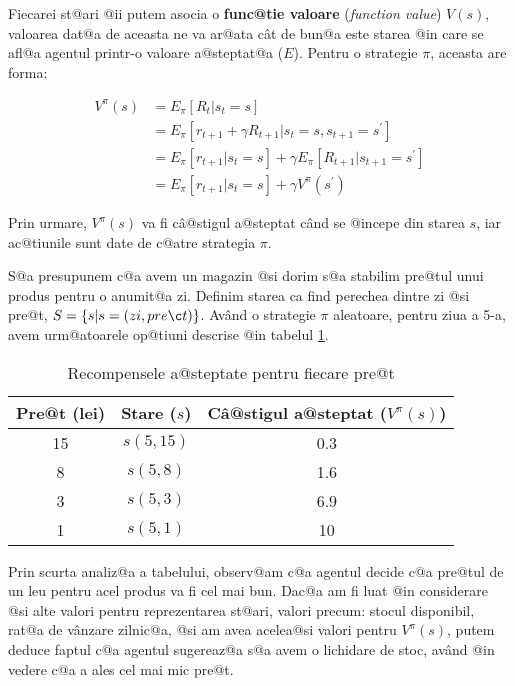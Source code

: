 Fiecarei st@ari @ii putem asocia o \textbf{func@tie valoare} (\textsl{function value}) $V(s)$, valoarea dat@a de aceasta ne va ar@ata c\^ at de bun@a este starea @in care se afl@a agentul printr-o valoare a@steptat@a ($E$). Pentru o strategie $\pi$, aceasta are forma:


\begin{align}
	V^{\pi}(s) & =   E_{\pi} \left[ R_t | s_t = s \right] \nonumber \\
	& =  E_{\pi} \left[ r_{t+1} + \gamma R_{t+1} | s_t = s, s_{t+1} = s^{\prime} \right] \nonumber \\
	& =   E_{\pi} \left[ r_{t+1}| s_t = s \right] + \gamma E_{\pi} \left[  R_{t+1} | s_{t+1} = s^{\prime} \right] \nonumber \\
	& =  E_{\pi} \left[ r_{t+1}| s_t = s \right] + \gamma V^{\pi}(s^{\prime})
\end{align}

\noindent Prin urmare, $V^{\pi}(s)$ va fi c\^ a@stigul a@steptat c\^ and se @incepe din starea $s$, iar ac@tiunile sunt date de c@atre strategia $\pi$.

S@a presupunem c@a avem un magazin @si dorim s@a stabilim pre@tul unui produs pentru o anumit@a zi. Definim starea ca find perechea dintre zi @si pre@t, $S = \left\lbrace  s | s = (zi, pre\c t) \right\rbrace$. Av\^ and o strategie $\pi$ aleatoare, pentru ziua a 5-a, avem urm@atoarele op@tiuni descrise @in tabelul \ref{tab:pret-magazin}.

\begin{table}[h]
	\begin{center}
		\begin{tabular}{|c|c|c|}
			\hline
			Pre@t (lei) & Stare ($s$) & C\^ a@stigul a@steptat ($V^{\pi}(s)$) \\
			\hline
			15 & $s(5,15)$ & 0.3 \\
			\hline
			8 & $s(5,8)$ & 1.6 \\
			\hline
			3 & $s(5,3)$ & 6.9 \\
			\hline
			1 & $s(5,1)$ & 10 \\ 
			\hline
		\end{tabular}
	\end{center}
	\caption{Recompensele a@steptate pentru fiecare pre@t}
	\label{tab:pret-magazin}
\end{table}

Prin scurta analiz@a a tabelului, observ@am c@a agentul decide c@a pre@tul de un leu pentru acel produs va fi cel mai bun. Dac@a am fi luat @in considerare @si alte valori pentru reprezentarea st@ari, valori precum: stocul disponibil, rat@a de v\^ anzare zilnic@a, @si am avea acelea@si valori pentru $V^{\pi}(s)$, putem deduce faptul c@a agentul sugereaz@a s@a avem o lichidare de stoc, av\^and @in vedere c@a a ales cel mai mic pre@t.

